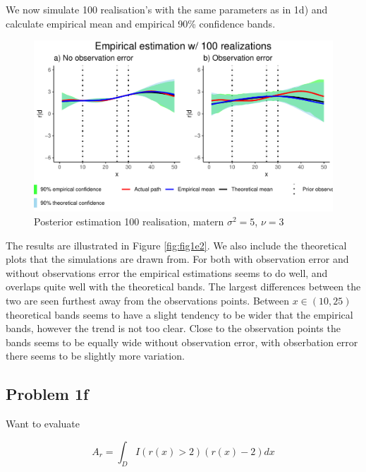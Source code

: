 \documentclass[]{article}
\begin{document}
We now simulate 100 realisation's with the same parameters as in 1d) and
calculate empirical mean and empirical 90\% confidence bands.

\begin{figure}

{\centering \includegraphics{Exercise-1_files/figure-latex/fig1e1-1} 

}

\caption{\label{fig:fig1e2} Posterior estimation 100 realisation, matern $\sigma^2 = 5$, $\nu = 3$}\label{fig:fig1e1}
\end{figure}

The results are illustrated in Figure \ref{fig:fig1e2}. We also include
the theoretical plots that the simulations are drawn from. For both with
observation error and without observations error the empirical
estimations seems to do well, and overlaps quite well with the
theoretical bands. The largest differences between the two are seen
furthest away from the observations points. Between \(x\in(10,25)\)
theoretical bands seems to have a slight tendency to be wider that the
empirical bands, however the trend is not too clear. Close to the
observation points the bands seems to be equally wide without
observation error, with obserbation error there seems to be slightly
more variation.

\hypertarget{problem-1f}{%
\subsection{Problem 1f}\label{problem-1f}}

Want to evaluate

\begin{equation}
    A_r = \int_D I(r(x) > 2)(r(x)-2) dx
\end{equation}
\end{document}
